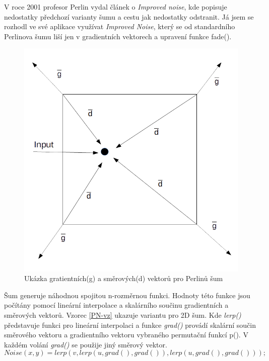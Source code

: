 V roce 2001 profesor Perlin vydal článek o \emph{Improved noise}\cite{KP-new}, kde popisuje nedostatky předchozí varianty šumu a cestu jak nedostatky odstranit. Já jsem se rozhodl ve své aplikace využívat \emph{Improved Noise}, který se od standardního Perlinova šumu liší jen v  gradientních vektorech a upravení funkce fade().
\begin{figure}
	\begin{center}
	\includegraphics[scale=0.25]{obrazky-figures/PN}
		\caption{Ukázka gratientních(g) a směrových(d) vektorů pro Perlinů šum}\label{aiAnimation}
\end{center}\end{figure}
Šum generuje náhodnou spojitou n-rozměrnou funkci. Hodnoty této funkce jsou počítány pomocí lineární interpolace a skalárního součinu gradientních a směrových vektorů. Vzorec \ref{PN-vz} ukazuje variantu pro 2D šum.
Kde \emph{lerp()} představuje funkci pro lineární interpolaci a funkce \emph{grad()}  provádí skalární součin směrového vektoru a gradientního vektoru vybraného permutační funkcí p(). V každém volání \emph{grad()} se použije jiný směrový vektor. 
\begin{equation}\label{PN-vz}
Noise(x,y) = lerp(v,lerp(u,grad(),grad()),lerp(u,grad(),grad()));
\end{equation}
